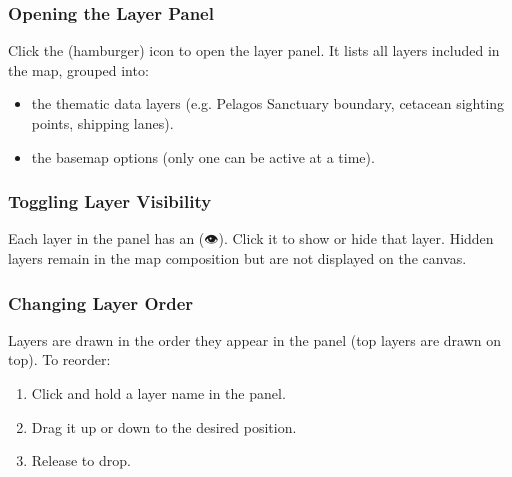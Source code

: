 \documentclass[letterpaper,10pt,english]{sphinxmanual}
\begin{document}
\subsubsection{Opening the Layer Panel}
\label{\detokenize{en/04_exploring_maps:opening-the-layer-panel}}
\sphinxAtStartPar
Click the  (hamburger) icon to open the layer panel. It lists all layers included
in the map, grouped into:
\begin{itemize}
\item {} 
\sphinxAtStartPar
{} \textendash{} the thematic data layers (e.g. Pelagos Sanctuary boundary, cetacean
sighting points, shipping lanes).

\item {} 
\sphinxAtStartPar
{} \textendash{} the basemap options (only one can be active at a time).

\end{itemize}


\subsubsection{Toggling Layer Visibility}
\label{\detokenize{en/04_exploring_maps:toggling-layer-visibility}}
\sphinxAtStartPar
Each layer in the panel has an  (👁). Click it to show or hide that layer.
Hidden layers remain in the map composition but are not displayed on the canvas.


\subsubsection{Changing Layer Order}
\label{\detokenize{en/04_exploring_maps:changing-layer-order}}
\sphinxAtStartPar
Layers are drawn in the order they appear in the panel (top layers are drawn on top).
To reorder:
\begin{enumerate}
%
\item {} 
\sphinxAtStartPar
Click and hold a layer name in the panel.

\item {} 
\sphinxAtStartPar
Drag it up or down to the desired position.

\item {} 
\sphinxAtStartPar
Release to drop.

\end{enumerate}
\end{document}
